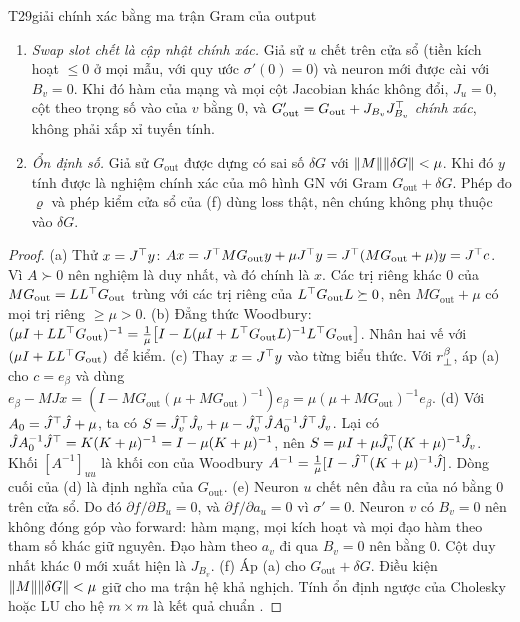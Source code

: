 \begin{namedthm}{T29}{giải chính xác bằng ma trận Gram của output}
\begin{enumerate}[label=(\alph*)]
\begin{itemize}
\item Đổi $J_u$ lấy $J_v$: $G_{\mathrm{out}}'=G_{\mathrm{out}}-J_uJ_u\T+J_vJ_v\T$, một cập nhật hạng thấp.
\end{itemize}
\item \emph{Swap slot chết là cập nhật chính xác.} Giả sử $u$ chết trên cửa sổ (tiền kích hoạt $\le0$ ở mọi mẫu, với quy ước $\sigma'(0)=0$) và neuron mới được cài với $B_v=0$. Khi đó hàm của mạng và mọi cột Jacobian khác không đổi, $J_u=0$, cột theo trọng số vào của $v$ bằng $0$, và $G_{\mathrm{out}}'=G_{\mathrm{out}}+J_{B_v}J_{B_v}^{\top}$ \emph{chính xác}, không phải xấp xỉ tuyến tính.
\item \emph{Ổn định số.} Giả sử $G_{\mathrm{out}}$ được dựng có sai số $\delta G$ với $\lVert M\rVert\lVert \delta G\rVert<\mu$. Khi đó $y$ tính được là nghiệm chính xác của mô hình GN với Gram $G_{\mathrm{out}}+\delta G$. Phép đo $\varrho$ và phép kiểm cửa sổ của (f) dùng loss thật, nên chúng không phụ thuộc vào $\delta G$.
\end{enumerate}
\end{namedthm}
\begin{proof}
(a) Thử $x=J^{\top} y$: $Ax=J^{\top} MG_{\mathrm{out}}y+\mu J^{\top} y=J^{\top}(MG_{\mathrm{out}}+\mu)y=J^{\top} c$. Vì $A\succ0$ nên nghiệm là duy nhất, và đó chính là $x$. Các trị riêng khác $0$ của $MG_{\mathrm{out}}=LL^{\top} G_{\mathrm{out}}$ trùng với các trị riêng của $L^{\top} G_{\mathrm{out}}L\succeq0$, nên $MG_{\mathrm{out}}+\mu$ có mọi trị riêng $\ge\mu>0$.
(b) Đẳng thức Woodbury: $(\mu I+LL^{\top} G_{\mathrm{out}})^{-1}=\tfrac1\mu\bigl[I-L(\mu I+L^{\top} G_{\mathrm{out}}L)^{-1}L^{\top} G_{\mathrm{out}}\bigr]$. Nhân hai vế với $(\mu I+LL^{\top} G_{\mathrm{out}})$ để kiểm.
(c) Thay $x=J^{\top} y$ vào từng biểu thức. Với $r_{\perp}^\beta$, áp (a) cho $c=e_\beta$ và dùng $e_\beta-MJx=(I-MG_{\mathrm{out}}(\mu+MG_{\mathrm{out}})^{-1})e_\beta=\mu(\mu+MG_{\mathrm{out}})^{-1}e_\beta$.
(d) Với $A_0=\hat J^{\top}\hat J+\mu$, ta có $S=\hat J_v^{\top}\hat J_v+\mu-\hat J_v^{\top}\hat JA_0^{-1}\hat J^{\top}\hat J_v$. Lại có $\hat JA_0^{-1}\hat J^{\top}=K(K+\mu)^{-1}=I-\mu(K+\mu)^{-1}$, nên $S=\mu I+\mu\hat J_v^{\top}(K+\mu)^{-1}\hat J_v$. Khối $[A^{-1}]_{uu}$ là khối con của Woodbury $A^{-1}=\tfrac1\mu[I-\hat J^{\top}(K+\mu)^{-1}\hat J]$. Dòng cuối của (d) là định nghĩa của $G_{\mathrm{out}}$.
(e) Neuron $u$ chết nên đầu ra của nó bằng $0$ trên cửa sổ. Do đó $\partial f/\partial B_u=0$, và $\partial f/\partial a_u=0$ vì $\sigma'=0$. Neuron $v$ có $B_v=0$ nên không đóng góp vào forward: hàm mạng, mọi kích hoạt và mọi đạo hàm theo tham số khác giữ nguyên. Đạo hàm theo $a_v$ đi qua $B_v=0$ nên bằng $0$. Cột duy nhất khác $0$ mới xuất hiện là $J_{B_v}$.
(f) Áp (a) cho $G_{\mathrm{out}}+\delta G$. Điều kiện $\lVert M\rVert\lVert \delta G\rVert<\mu$ giữ cho ma trận hệ khả nghịch. Tính ổn định ngược của Cholesky hoặc LU cho hệ $m\times m$ là kết quả chuẩn \cite{higham2002}.
\end{proof}
